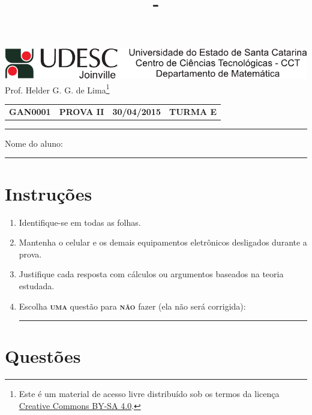 \documentclass[12pt,a4paper]{article}
\author{\eu}
\title{\tipo - \disciplina}
\date{\data}
\newcommand*\tipo{PROVA II}
\newcommand*\turma{TURMA E}
\newcommand*\disciplina{GAN0001}
\newcommand*\eu{Helder G. G. de Lima}
\newcommand*\data{30/04/2015}
\begin{document}
\thispagestyle{empty}
\begin{center}
\includegraphics{udesc_joinville_cabecalho.pdf}
\\ Prof. \eu\footnote{
Este é um material de acesso livre distribuído sob os termos da licença \href{https://creativecommons.org/licenses/by-sa/4.0/deed.pt_BR}{Creative Commons BY-SA 4.0}.}

\noindent\begin{tabular}{l c c r}
  \textbf{\disciplina}
& \textbf{\tipo}
& \textbf{\data}
& \textbf{\turma}
\end{tabular}\vspace{-0.3cm}
\noindent\rule{17cm}{0.01cm}
\end{center}

\noindent Nome do aluno: \rule{14cm}{0.01cm}

\section*{Instruções}

\begin{enumerate}
\renewcommand{\theenumi}{\Roman{enumi}}
\item Identifique-se em todas as folhas.
\item Mantenha o celular e os demais equipamentos eletrônicos desligados durante a prova.
\item Justifique cada resposta com cálculos ou argumentos baseados na teoria estudada.
\item Escolha \textsc{\textbf{uma}} questão para \textsc{\textbf{não}} fazer (ela não será corrigida): \rule{3cm}{0.01cm}
\end{enumerate}

\section*{Questões}
\end{document}
